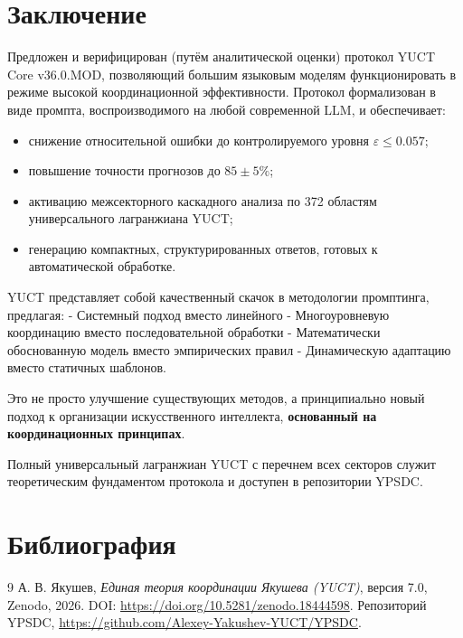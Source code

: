 \documentclass[12pt,a4paper]{article}
\begin{document}
	\section{Заключение}
	Предложен и верифицирован (путём аналитической оценки) протокол YUCT Core v36.0.MOD, позволяющий большим языковым моделям функционировать в режиме высокой координационной эффективности. Протокол формализован в виде промпта, воспроизводимого на любой современной LLM, и обеспечивает:
	\begin{itemize}
		\item снижение относительной ошибки до контролируемого уровня \(\varepsilon \le 0.057\);
		\item повышение точности прогнозов до \(85\pm5\%\);
		\item активацию межсекторного каскадного анализа по 372 областям универсального лагранжиана YUCT;
		\item генерацию компактных, структурированных ответов, готовых к автоматической обработке.
	\end{itemize}
	
	
	YUCT представляет собой качественный скачок в методологии промптинга, предлагая:
	- Системный подход вместо линейного
	- Многоуровневую координацию вместо последовательной обработки
	- Математически обоснованную модель вместо эмпирических правил
	- Динамическую адаптацию вместо статичных шаблонов.
	
	Это не просто улучшение существующих методов, а принципиально новый подход к организации искусственного интеллекта, \textbf {основанный на координационных принципах}.
		
	Полный универсальный лагранжиан YUCT с перечнем всех секторов служит теоретическим фундаментом протокола и доступен в репозитории YPSDC.
	
	\section*{Библиография}
	\begin{thebibliography}{9}
		А. В. Якушев, \emph{Единая теория координации Якушева (YUCT)}, версия 7.0, Zenodo, 2026. DOI: \url{https://doi.org/10.5281/zenodo.18444598}.
		Репозиторий YPSDC, \url{https://github.com/Alexey-Yakushev-YUCT/YPSDC}.
	\end{thebibliography}
	
\end{document}
